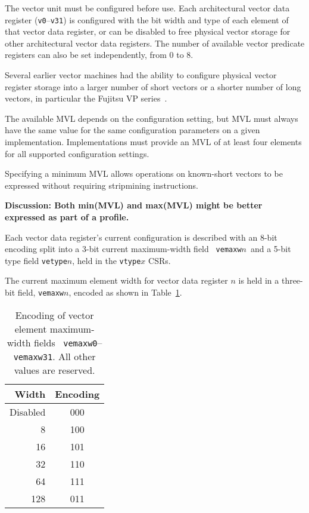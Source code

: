 The vector unit must be configured before use.  Each architectural
vector data register ({\tt v0}--{\tt v31}) is configured with the bit
width and type of each element of that vector data register, or can be
disabled to free physical vector storage for other architectural
vector data registers.  The number of available vector predicate
registers can also be set independently, from 0 to 8.

\begin{commentary}
  Several earlier vector machines had the ability to configure
  physical vector register storage into a larger number of short
   vectors or a shorter number of long vectors, in particular the
  Fujitsu VP series~\cite{vp200}.
\end{commentary}

The available MVL depends on the configuration setting, but MVL must
always have the same value for the same configuration parameters on a
given implementation.  Implementations must provide an MVL of at least
four elements for all supported configuration settings.

\begin{commentary}
  Specifying a minimum MVL allows operations on known-short vectors to
  be expressed without requiring stripmining instructions.

  {\bf Discussion: Both min(MVL) and max(MVL) might be better
    expressed as part of a profile.}
\end{commentary}

Each vector data register's current configuration is described with an
8-bit encoding split into a 3-bit current maximum-width field {\tt
  vemaxw}$n$\, and a 5-bit type field {\tt vetype}$n$, held in the
{\tt vtype}$x$ CSRs.

The current maximum element width for vector data register $n$ is held
in a three-bit field, {\tt vemaxw}$n$, encoded as shown in
Table~\ref{tab:vemaxw}.

\begin{table}[hbt]
  \centering
  \begin{tabular}{|r|c|}
    \hline
    Width & Encoding \\
    \hline
    Disabled  & 000 \\
    8         & 100  \\
    16        & 101  \\
    32        & 110  \\
    64        & 111  \\
    128       & 011  \\
    \hline
  \end{tabular}
  \caption{Encoding of vector element maximum-width fields {\tt
      vemaxw0}--{\tt vemaxw31}. All other values are reserved.}
  \label{tab:vemaxw}
\end{table}

